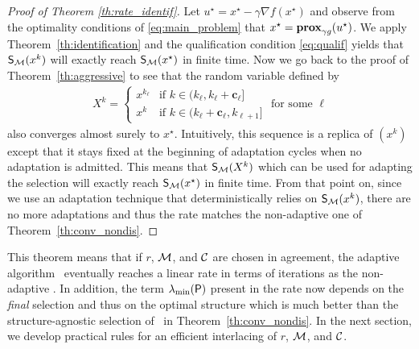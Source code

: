 \begin{proof}[Proof of Theorem \ref{th:rate_identif}]
Let $u^\star = x^\star-\gamma \nabla f(x^\star)$ and observe from the optimality conditions of \eqref{eq:main_problem} that $x^\star =  \prox_{\gamma g}(u^\star)$. We apply Theorem~\ref{th:identification} and the qualification condition \eqref{eq:qualif} yields that $\S(x^k)$ will exactly reach $\S(x^\star)$ in finite time. Now we go back to the proof of Theorem~\ref{th:aggressive} to see that the random variable defined by
\begin{align*}
    X^k = \left\{ \begin{array}{cl}
            x^{k_{\ell}} & \textrm{if } k\in(k_{\ell},k_{\ell}+\mathbf{c}_\ell]   \\
        x^k & \textrm{if } k\in(k_{\ell}+\mathbf{c}_\ell , k_{\ell+1}]  
    \end{array}\right. \textrm{ for some } \ell
\end{align*}
also converges almost surely to $x^\star$. Intuitively, this sequence is a replica of $(x^k)$ except that it stays fixed at the beginning of adaptation cycles when no adaptation is admitted. 
This means that $\S(X^k)$ which can be used for adapting the selection will exactly reach $\S(x^\star)$ in finite time.
From that point on, since we use an adaptation technique that deterministically relies on $\S(x^k)$, there are no more adaptations and thus the rate matches the non-adaptive one of Theorem~\ref{th:conv_nondis}.
\end{proof}

{
This theorem means that if $r$, $\M$, and $\C$ are chosen in agreement, the adaptive algorithm \adaalgo~eventually reaches a linear rate in terms of iterations as the non-adaptive \algo. In addition, the term $\lambda_{\min}(\bP)$ present in the rate now depends on the \emph{final} selection and thus on the optimal structure which is much better than the structure-agnostic selection of \algo~in Theorem~\ref{th:conv_nondis}.  In the next section, we develop  practical rules for an efficient interlacing of $r$, $\M$, and $\C$. %
}


